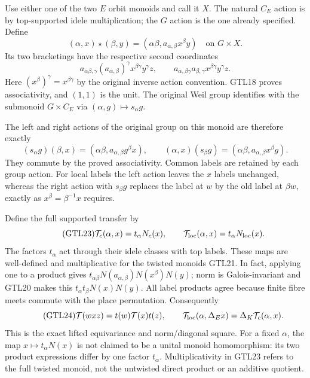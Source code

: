 Use either one of the two $E$ orbit monoids and call it $X$.
The natural $C_E$ action is by top-supported idele multiplication;
the $G$ action is the one already specified. Define
\begin{equation}\tag{GTL21}
 (\alpha,x)\star(\beta,y)
       =(\alpha\beta,a_{\alpha,\beta}x^\beta y)
                     \quad\text{on }G\times X.
\end{equation}
Its two bracketings have the respective second coordinates
\[
 a_{\alpha\beta,\gamma}(a_{\alpha,\beta})^\gamma
         x^{\beta\gamma}y^\gamma z,
 \qquad
 a_{\alpha,\beta\gamma}a_{\beta,\gamma}
         x^{\beta\gamma}y^\gamma z.
\]
Here $(x^\beta)^\gamma=x^{\beta\gamma}$ by the original inverse
action convention. GTL18 proves associativity, and $(1,1)$ is
the unit. The original Weil group identifies with the submonoid
$G\times C_E$ via $(\alpha,g)\mapsto s_\alpha g$.

The left and right actions of the original group on this monoid are
therefore exactly
\begin{equation}\tag{GTL22}
 (s_\alpha g)(\beta,x)
   =(\alpha\beta,a_{\alpha,\beta}g^\beta x),\qquad
 (\alpha,x)(s_\beta g)
   =(\alpha\beta,a_{\alpha,\beta}x^\beta g).
\end{equation}
They commute by the proved associativity. Common labels are
retained by each group action. For local labels the left action
leaves the $x$ labels unchanged, whereas the right action with
$s_\beta g$ replaces the label at $w$ by the old label at
$\beta w$, exactly as $x^\beta=\beta^{-1}x$ requires.

Define the full supported transfer by
\begin{equation}\tag{GTL23}
 \mathcal T_c(\alpha,x)=t_\alpha N_c(x),\qquad
 \mathcal T_{\rm loc}(\alpha,x)=t_\alpha N_{\rm loc}(x).
\end{equation}
The factors $t_\alpha$ act through their idele classes with top
labels. These maps are well-defined and multiplicative for the
twisted monoids GTL21. In fact, applying one to a product gives
$t_{\alpha\beta}N(a_{\alpha,\beta})N(x^\beta)N(y)$;
norm is Galois-invariant and GTL20 makes this
$t_\alpha t_\beta N(x)N(y)$. All label products agree because
finite fibre meets commute with the place permutation.
Consequently
\begin{equation}\tag{GTL24}
 \mathcal T(wxz)=t(w)\mathcal T(x)t(z),\qquad
 \mathcal T_{\rm loc}(\alpha,\Delta_E x)
                          =\Delta_K\mathcal T_c(\alpha,x).
\end{equation}
This is the exact lifted equivariance and norm/diagonal square.
For a fixed $\alpha$, the map $x\mapsto t_\alpha N(x)$ is not
claimed to be a unital monoid homomorphism: its two product
expressions differ by one factor $t_\alpha$. Multiplicativity
in GTL23 refers to the full twisted monoid, not the untwisted
direct product or an additive quotient.


